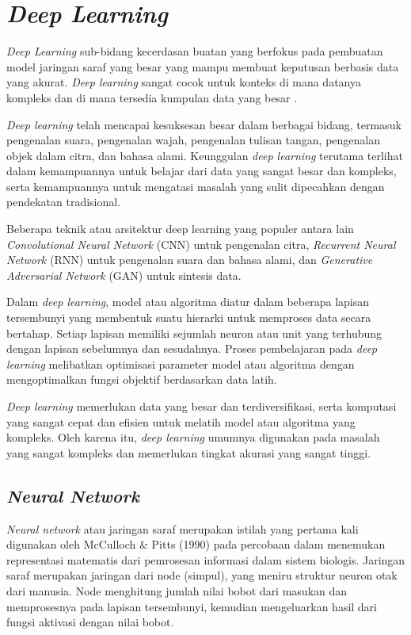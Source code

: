 \section{\textit{Deep Learning}}
\textit{Deep Learning} sub-bidang kecerdasan buatan yang berfokus pada pembuatan model jaringan saraf yang besar yang mampu membuat keputusan berbasis data yang akurat. \textit{Deep learning} sangat cocok untuk konteks di mana datanya kompleks dan di mana tersedia kumpulan data yang besar \cite{kelleher2019}.

\textit{Deep learning} telah mencapai kesuksesan besar dalam berbagai bidang, termasuk pengenalan suara, pengenalan wajah, pengenalan tulisan tangan, pengenalan objek dalam citra, dan bahasa alami. Keunggulan \textit{deep learning} terutama terlihat dalam kemampuannya untuk belajar dari data yang sangat besar dan kompleks, serta kemampuannya untuk mengatasi masalah yang sulit dipecahkan dengan pendekatan tradisional.

Beberapa teknik atau arsitektur deep learning yang populer antara lain \textit{Convolutional Neural Network} (CNN) untuk pengenalan citra, \textit{Recurrent Neural Network} (RNN) untuk pengenalan suara dan bahasa alami, dan \textit{Generative Adversarial Network} (GAN) untuk sintesis data.

Dalam \textit{deep learning}, model atau algoritma diatur dalam beberapa lapisan tersembunyi yang membentuk suatu hierarki untuk memproses data secara bertahap. Setiap lapisan memiliki sejumlah neuron atau unit yang terhubung dengan lapisan sebelumnya dan sesudahnya. Proses pembelajaran pada \textit{deep learning} melibatkan optimisasi parameter model atau algoritma dengan mengoptimalkan fungsi objektif berdasarkan data latih. 

\textit{Deep learning} memerlukan data yang besar dan terdiversifikasi, serta komputasi yang sangat cepat dan efisien untuk melatih model atau algoritma yang kompleks. Oleh karena itu, \textit{deep learning} umumnya digunakan pada masalah yang sangat kompleks dan memerlukan tingkat akurasi yang sangat tinggi.

\subsection{\textit{Neural Network}}
\textit{Neural network} atau jaringan saraf merupakan istilah yang pertama kali digunakan oleh McCulloch \& Pitts (1990) pada percobaan dalam menemukan representasi matematis dari pemrosesan informasi dalam sistem biologis. Jaringan saraf merupakan jaringan dari node (simpul), yang meniru struktur neuron otak dari manusia. Node menghitung jumlah nilai bobot dari masukan dan memprosesnya pada lapisan tersembunyi, kemudian mengeluarkan hasil dari fungsi aktivasi dengan nilai bobot.

